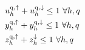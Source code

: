 \documentclass[conference]{IEEEtran}
\begin{document}
{\begin{subequations}
\begin{align}
        \  & u_{h}^{\rm{q},\uparrow} + u_{h}^{\rm{q},\downarrow} \leq 1 \                                                           \forall{h,q}                                                                                                                                                                     \label{aux:5}                                                                                                                                                                                                                           \\
        \  & y_{h}^{\rm{q},\uparrow} + y_{h}^{\rm{q},\downarrow} \leq 1 \                                                           \forall{h,q}                                                                                                                                                                                   \label{aux:6}                                                                                                                                                                                                             \\
        \  & z_{h}^{\rm{q},\uparrow} + z_{h}^{\downarrow} \leq 1 \                                                           \forall{h,q} \label{aux:7}                                                                                                                                                                                                                                                                                                                                                                                               \\

\end{align}
\end{subequations}}
\end{document}
